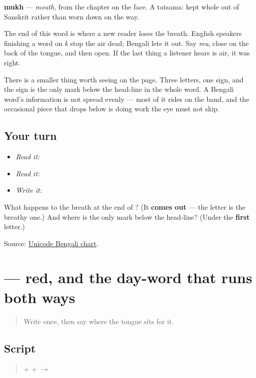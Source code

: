 \textbf{mukh} — \emph{mouth}, from the chapter on the face. A tatsama: kept whole out of Sanskrit rather than worn down on the way.

The end of this word is where a new reader loses the breath. English speakers finishing a word on \emph{k} stop the air dead; Bengali lets it out. Say \emph{mu}, close on the back of the tongue, and then open. If the last thing a listener hears is air, it was right.

There is a smaller thing worth seeing on the page. Three letters, one sign, and the sign is the only mark below the head-line in the whole word. A Bengali word's information is not spread evenly — most of it rides on the band, and the occasional piece that drops below is doing work the eye must not skip.

\subsection*{Your turn}
\begin{itemize}
\raggedright
  \item \emph{Read it:} 
  \item \emph{Read it:} 
  \item \emph{Write it:} 
\end{itemize}

\begin{tcolorbox}[breakable,colback=teal!4,colframe=teal!35!black,title={Before you move on}]
What happens to the breath at the end of \textbf{}? (It \textbf{comes out} — the letter is the breathy one.) And where is the only mark below the head-line? (Under the \textbf{first} letter.)

Source: \href{https://www.unicode.org/charts/PDF/U0980.pdf}{Unicode Bengali chart}.
\end{tcolorbox}
\section[lāl]{ — red, and the day-word that runs both ways}

\label{lesson:BN-W02-lal-read}



\begin{quote}
Write \textbf{} once, then say where the tongue sits for it.
\end{quote}

\subsection*{Script}
\begin{quote}
\textbf{} + \textbf{} + \textbf{} $\to$ \textbf{}
\end{quote}

